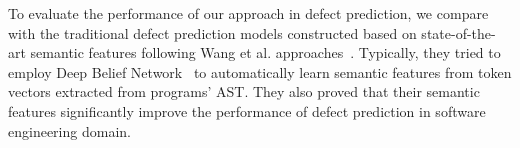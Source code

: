 
To evaluate the performance of our approach in defect prediction, we compare with the traditional defect prediction models constructed based on state-of-the-art semantic features following Wang et al. approaches~\cite{wang2016automatically}. Typically, they tried to employ Deep Belief Network~\cite{hinton2009deep} to automatically learn semantic features from token vectors extracted from programs' AST. They also proved that their semantic features significantly improve the performance of defect prediction in software engineering domain. 


